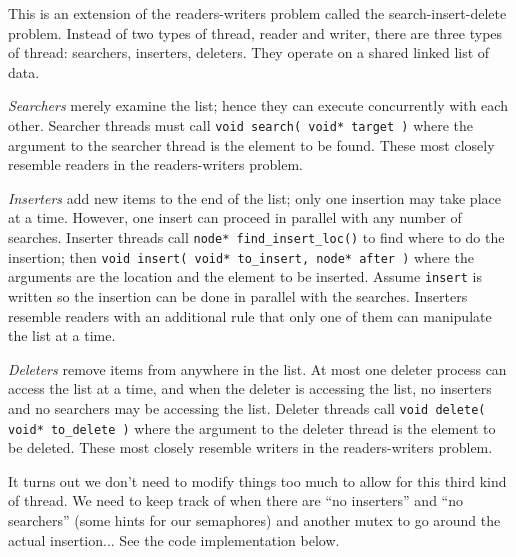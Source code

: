 \documentclass[a4paper]{report}
\begin{document}
This is an extension of the readers-writers problem called the search-insert-delete problem. Instead of two types of thread, reader and writer, there are three types of thread: searchers, inserters, deleters. They operate on a shared linked list of data.

\textit{Searchers} merely examine the list; hence they can execute concurrently with each other. Searcher threads must call \texttt{void search( void* target )} where the argument to the searcher thread is the element to be found. These most closely resemble readers in the readers-writers problem.

\textit{Inserters} add new items to the end of the list; only one insertion may take place at a time. However, one insert can proceed in parallel with any number of searches. Inserter threads call \texttt{node* find\_insert\_loc()} to find where to do the insertion; then \texttt{void insert( void* to\_insert, node* after )} where the arguments are the location and the element to be inserted. Assume \texttt{insert} is written so the insertion can be done in parallel with the searches. Inserters resemble readers with an additional rule that only one of them can manipulate the list at a time.

\textit{Deleters} remove items from anywhere in the list. At most one deleter process can access the list at a time, and when the deleter is accessing the list, no inserters and no searchers may be accessing the list. Deleter threads call \texttt{void delete( void* to\_delete )} where the argument to the deleter thread is the element to be deleted. These most closely resemble writers in the readers-writers problem.

It turns out we don't need to modify things too much to allow for this third kind of thread. We need to keep track of when there are ``no inserters'' and ``no searchers'' (some hints for our semaphores) and another mutex to go around the actual insertion... See the code implementation below.
\end{document}
